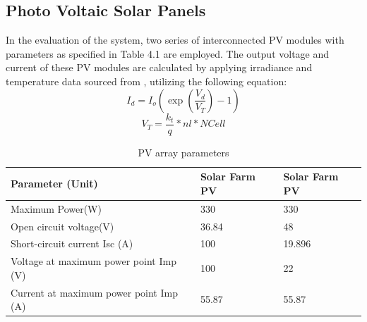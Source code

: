 \subsection{Photo Voltaic Solar Panels}
In the evaluation of the system, two series of interconnected PV modules with parameters as specified in Table 4.1 are employed. The output voltage and current of these PV modules are calculated by applying irradiance and temperature data sourced from \cite{41}, utilizing the following equation:
\begin{equation}
	{I_d}={I_o}(\exp(\frac{{V_d}}{{V_T}})-1)
\end{equation}
\begin{equation}
	{V_T}=\frac{{k_t}}{{q}}*nl*NCell
\end{equation}

\begin{center}
	\begin{table}[!ht]
		\begin{center}
			\caption{PV array parameters}
			\begin{tabular}{|p{6cm}|p{4cm}|p{4cm}|} %
				\hline
				\textbf{Parameter (Unit)} & \textbf{Solar Farm PV} & \textbf{Solar Farm PV}\\
				\hline
				Maximum Power(W) & 330 & 330\\
				\hline
				Open circuit voltage(V) & 36.84 & 48\\
				\hline
				Short-circuit current Isc (A) & 100 & 19.896\\
				\hline
				Voltage at maximum power point Imp (V) & 100 & 22\\
				\hline
				Current at maximum power point Imp (A) & 55.87 & 55.87\\
				\hline
			\end{tabular}
		\end{center}
	\end{table}
\end{center}


